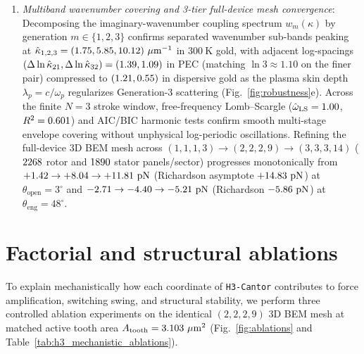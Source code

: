 \documentclass[pdflatex,sn-nature]{sn-jnl}
\begin{document}
\begin{enumerate}
    \item \emph{Multiband wavenumber covering and 3-tier full-device mesh convergence}: Decomposing the imaginary-wavenumber coupling spectrum $w_m(\kappa)$ by generation $m \in \{1,2,3\}$ confirms separated wavenumber sub-bands peaking at $\hat{\kappa}_{1,2,3} = (\HthreeSymGoldKoneDisp{}, \HthreeSymGoldKtwoDisp{}, \HthreeSymGoldKthreeDisp{})\ \mu\mathrm{m}^{-1}$ in $300\ \mathrm{K}$ gold, with adjacent log-spacings $(\Delta\ln\hat{\kappa}_{21}, \Delta\ln\hat{\kappa}_{32}) = (1.39{}, 1.09{})$ in PEC (matching $\ln 3 \approx 1.10$ on the finer pair) compressed to $(1.21{}, 0.55{})$ in dispersive gold as the plasma skin depth $\lambda_p = c/\omega_p$ regularizes Generation-3 scattering (Fig.~\ref{fig:robustness}e). Across the finite $N=3$ stroke window, free-frequency Lomb--Scargle\cite{scargle1982} ($\hat{\omega}_{\mathrm{LS}} = 1.00{}$, $R^2 = 0.601{}$) and AIC/BIC harmonic tests confirm smooth multi-stage envelope covering without unphysical log-periodic oscillations. Refining the full-device 3D BEM mesh across $(1,1,1,3) \to (2,2,2,9) \to (3,3,3,14)$ ($2268{}$ rotor and $1890{}$ stator panels/sector) progresses monotonically from $\HthreeMeshToneOpenDisp{} \to \HthreeMeshTtwoOpenDisp{} \to \HthreeMeshTthreeOpenDisp{}\ \mathrm{pN}$ (Richardson asymptote $+14.83{}\ \mathrm{pN}$) at $\theta_{\mathrm{open}}=3^\circ$ and $\HthreeMeshToneEngDisp{} \to \HthreeMeshTtwoEngDisp{} \to \HthreeMeshTthreeEngDisp{}\ \mathrm{pN}$ (Richardson $-5.86{}\ \mathrm{pN}$) at $\theta_{\mathrm{eng}}=48^\circ$.
\end{enumerate}

\section*{Factorial and structural ablations}
\label{sec:ablations}

To explain mechanistically how each coordinate of \texttt{H3-Cantor} contributes to force amplification, switching swing, and structural stability, we perform three controlled ablation experiments on the identical $(2,2,2,9)$ 3D BEM mesh at matched active tooth area $A_{\mathrm{tooth}} = \RobAtoothUmtwoDisp{}\ \mu\mathrm{m}^2$ (Fig.~\ref{fig:ablations} and Table~\ref{tab:h3_mechanistic_ablations}).
\end{document}
